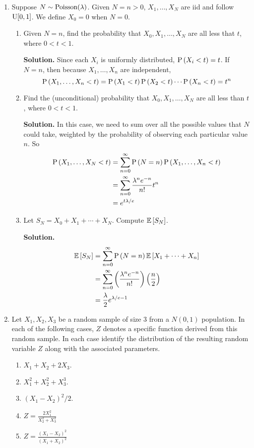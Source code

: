 \documentclass[titlepage]{article}
\begin{document}
\begin{enumerate}
\item Suppose $N \dist \pois(\lambda)$. Given $N = n > 0$, $X_1, \ldots, X_N$ are iid and follow $\U[0, 1]$. We define $X_0 = 0$ when $N = 0$.
  \begin{enumerate}
  \item Given $N = n$, find the probability that $X_0, X_1, \ldots, X_N$ are all less that $t$, where $0 < t < 1$.

  \textbf{Solution.} Since each $X_i$ is uniformly distributed, $\P{X_i < t} = t$. If $N = n$, then because $X_1, \ldots, X_n$ are independent,
  \[\P{X_1, \ldots, X_n < t} = \P{X_1 < t}\P{X_2 < t}\cdots\P{X_n < t} = t^n\]

  \item Find the (unconditional) probability that $X_0, X_1, \ldots, X_N$ are all less than $t$, where $0 < t < 1$.

  \textbf{Solution.} In this case, we need to sum over all the possible values that $N$ could take, weighted by the probability of observing each particular value $n$. So
  \[\begin{aligned}
  \P{X_1, \ldots, X_N < t} &= \sum_{n = 0}^\infty \P{N = n} \P{X_1, \ldots, X_n < t} \\
  &= \sum_{n = 0}^\infty \frac{\lambda^n e^{-n}}{n!}t^n\\
  &= e^{t\lambda/e}
  \end{aligned}\]

  \item Let $S_N = X_0 + X_1 + \cdots + X_N$. Compute $\ev{S_N}$.

  \textbf{Solution.}
  \[\begin{aligned}
  \ev{S_N} &= \sum_{n = 0}^{\infty} \P{N = n} \ev{X_1 + \cdots + X_n} \\
  &= \sum_{n=0}^\infty \left(\frac{\lambda^n e^{-n}}{n!} \right) \left(\frac{n}{2}\right)\\
  &= \frac{\lambda}{2}e^{\lambda/e - 1}
  \end{aligned}\]
  \end{enumerate}

\item Let $X_1, X_2, X_3$ be a random sample of size 3 from a $N(0, 1)$ population. In each of the following cases, $Z$ denotes a specific function derived from this random sample. In each case identify the distribution of the resulting random variable $Z$ along with the associated parameters.
  \begin{enumerate}
  \item $X_1 + X_2 + 2X_3$.

  \item $X_1^2 + X_2^2 + X_3^3$.

  \item $(X_1 - X_2)^2 / 2$.

  \item $Z = \frac{2X_1^2}{X_2^2 + X_3^2}$

  \item $Z = \frac{(X_1 - X_2)^2}{(X_1 + X_2)^2}$
  \end{enumerate}
\end{enumerate}
\end{document}
